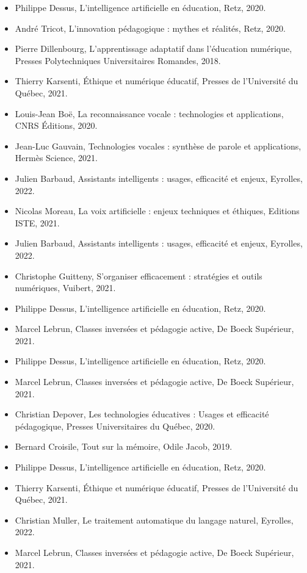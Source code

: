 \documentclass[11pt,a4paper]{report}
\begin{document}
\begin{itemize}
    \item Philippe Dessus, L’intelligence artificielle en éducation, Retz, 2020.
    \item André Tricot, L’innovation pédagogique : mythes et réalités, Retz, 2020.
    \item Pierre Dillenbourg, L’apprentissage adaptatif dans l’éducation numérique, Presses Polytechniques Universitaires Romandes, 2018.
    \item Thierry Karsenti, Éthique et numérique éducatif, Presses de l’Université du Québec, 2021.
    
    \item Louis-Jean Boë, La reconnaissance vocale : technologies et applications, CNRS Éditions, 2020.
    \item Jean-Luc Gauvain, Technologies vocales : synthèse de parole et applications, Hermès Science, 2021.
    \item Julien Barbaud, Assistants intelligents : usages, efficacité et enjeux, Eyrolles, 2022.
    \item Nicolas Moreau, La voix artificielle : enjeux techniques et éthiques, Editions ISTE, 2021.
    
    \item Julien Barbaud, Assistants intelligents : usages, efficacité et enjeux, Eyrolles, 2022.
    \item Christophe Guitteny, S'organiser efficacement : stratégies et outils numériques, Vuibert, 2021.
    \item Philippe Dessus, L’intelligence artificielle en éducation, Retz, 2020.
    \item Marcel Lebrun, Classes inversées et pédagogie active, De Boeck Supérieur, 2021.
    
    \item Philippe Dessus, L'intelligence artificielle en éducation, Retz, 2020.
    \item Marcel Lebrun, Classes inversées et pédagogie active, De Boeck Supérieur, 2021.
    \item Christian Depover, Les technologies éducatives : Usages et efficacité pédagogique, Presses Universitaires du Québec, 2020.

    \item Bernard Croisile, Tout sur la mémoire, Odile Jacob, 2019.
    \item Philippe Dessus, L’intelligence artificielle en éducation, Retz, 2020.
    \item Thierry Karsenti, Éthique et numérique éducatif, Presses de l’Université du Québec, 2021.
    \item Christian Muller, Le traitement automatique du langage naturel, Eyrolles, 2022.
    \item Marcel Lebrun, Classes inversées et pédagogie active, De Boeck Supérieur, 2021.
    

\end{itemize}
\end{document}
